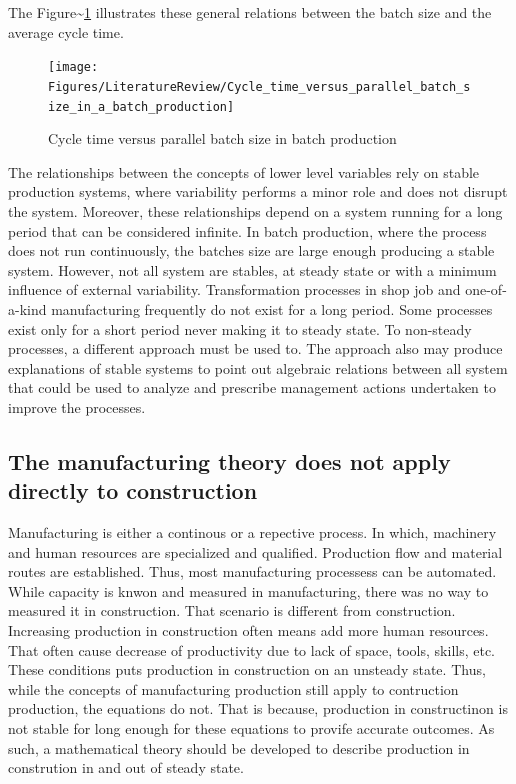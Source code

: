 \documentclass{article}
\begin{document}
The Figure\textasciitilde{}\ref{fig:Cycle time versus parallel batch size in batch production} illustrates these general relations between the batch size and the average cycle time.

\begin{figure}[H]
  \centering
  \texttt{[image: Figures/LiteratureReview/Cycle\_time\_versus\_parallel\_batch\_size\_in\_a\_batch\_production]}
  \caption{Cycle time versus parallel batch size in batch production}\label{fig:Cycle time versus parallel batch size in batch production}
\end{figure}

The relationships between the concepts of lower level variables rely on stable production systems, where variability performs a minor role and does not disrupt the system.
Moreover, these relationships depend on a system running for a long period that can be considered infinite.
In batch production, where the process does not run continuously, the batches size are large enough producing a stable system.
However, not all system are stables, at steady state or with a minimum influence of external variability.
Transformation processes in shop job and one-of-a-kind manufacturing frequently do not exist for a long period.
Some processes exist only for a short period never making it to steady state.
To non-steady processes, a different approach must be used to.
The approach also may produce explanations of stable systems to point out algebraic relations between all system that could be used to analyze and prescribe management actions undertaken to improve the processes.

\subsection{The manufacturing theory does not apply directly to construction}
\label{sec:org2350a1f}
Manufacturing is either a continous or a repective process.
In which, machinery and human resources are specialized and qualified.
Production flow and material routes are established. 
Thus, most manufacturing processess can be automated.
While capacity is knwon and measured in manufacturing, there was no way to measured it in construction.
That scenario is different from construction.
Increasing production in construction often means add more human resources.
That often cause decrease of productivity due to lack of space, tools, skills, etc.
These conditions puts production in construction on an unsteady state.
Thus, while the concepts of manufacturing production still apply to contruction production, the equations do not.
That is because, production in constructinon is not stable for long enough for these equations to provife accurate outcomes.
As such, a mathematical theory should be developed to describe production in constrution in and out of steady state.
\end{document}
